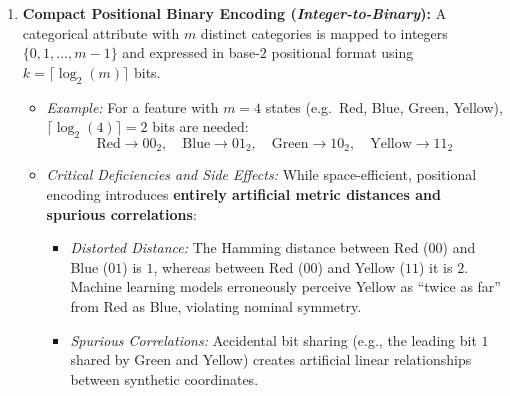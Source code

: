 \begin{enumerate}
    \item \textbf{Compact Positional Binary Encoding (\textit{Integer-to-Binary}):}
    A categorical attribute with $m$ distinct categories is mapped to integers $\{0, 1, \dots, m-1\}$ and expressed in base-$2$ positional format using $k = \lceil \log_2(m) \rceil$ bits.
    \begin{itemize}
        \item \textit{Example:} For a feature with $m=4$ states (e.g.~Red, Blue, Green, Yellow), $\lceil \log_2(4) \rceil = 2$ bits are needed:
        \begin{equation}
        \text{Red} \to 00_2, \quad \text{Blue} \to 01_2, \quad \text{Green} \to 10_2, \quad \text{Yellow} \to 11_2
        \end{equation}
        \item \textit{Critical Deficiencies and Side Effects:} While space-efficient, positional encoding introduces \textbf{entirely artificial metric distances and spurious correlations}:
        \begin{itemize}
            \item \textit{Distorted Distance:} The Hamming distance between Red ($00$) and Blue ($01$) is $1$, whereas between Red ($00$) and Yellow ($11$) it is $2$. Machine learning models erroneously perceive Yellow as ``twice as far'' from Red as Blue, violating nominal symmetry.
            \item \textit{Spurious Correlations:} Accidental bit sharing (e.g., the leading bit $1$ shared by Green and Yellow) creates artificial linear relationships between synthetic coordinates.
        \end{itemize}
    \end{itemize}


\end{enumerate}
